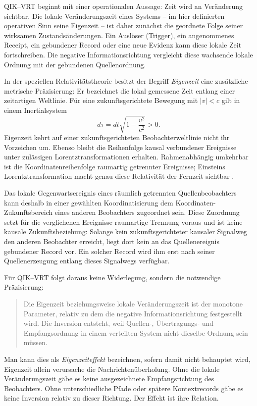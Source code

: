 \documentclass[11pt,a4paper]{article}
\theoremstyle{remark}
\newcommand{\qikvrt}{QIK--VRT}
\begin{document}
QIK--VRT beginnt mit einer operationalen Aussage: Zeit wird an Veränderung
sichtbar. Die lokale Veränderungszeit eines Systems -- im hier definierten
operativen Sinn seine Eigenzeit -- ist daher zunächst die geordnete Folge
seiner wirksamen Zustandsänderungen. Ein Auslöser (Trigger), ein angenommenes
Receipt, ein gebundener Record oder eine neue Evidenz kann diese lokale Zeit
fortschreiben. Die negative Informationsrichtung vergleicht diese wachsende
lokale Ordnung mit der gebundenen Quellenordnung.

In der speziellen Relativitätstheorie besitzt der Begriff \emph{Eigenzeit}
eine zusätzliche metrische Präzisierung: Er bezeichnet die lokal gemessene
Zeit entlang einer zeitartigen Weltlinie. Für eine zukunftsgerichtete Bewegung
mit \(|v|<c\) gilt in einem Inertialsystem
\[
  d\tau=dt\sqrt{1-\frac{v^2}{c^2}}>0.
\]
Eigenzeit kehrt auf einer zukunftsgerichteten Beobachterweltlinie nicht ihr
Vorzeichen um. Ebenso bleibt die Reihenfolge kausal verbundener Ereignisse
unter zulässigen Lorentztransformationen erhalten. Rahmenabhängig umkehrbar
ist die Koordinatenreihenfolge raumartig getrennter Ereignisse; Einsteins
Lorentztransformation macht genau diese Relativität der Fernzeit sichtbar
\cite{Einstein1905,Minkowski1909}.

Das lokale Gegenwartsereignis eines räumlich getrennten Quellenbeobachters
kann deshalb in einer gewählten Koordinatisierung dem
Koordinaten-Zukunftsbereich eines anderen Beobachters zugeordnet sein. Diese
Zuordnung setzt für die verglichenen Ereignisse raumartige Trennung voraus und
ist keine kausale Zukunftsbeziehung: Solange kein zukunftsgerichteter kausaler
Signalweg den anderen Beobachter erreicht, liegt dort kein an das
Quellenereignis gebundener Record vor. Ein solcher Record wird ihm erst nach
seiner Quellenerzeugung entlang dieses Signalwegs verfügbar.

Für \qikvrt{} folgt daraus keine Widerlegung, sondern die notwendige
Präzisierung:

\begin{quote}
Die Eigenzeit beziehungsweise lokale Veränderungszeit ist der monotone
Parameter, relativ zu dem die negative Informationsrichtung festgestellt wird.
Die Inversion entsteht, weil Quellen-, Übertragungs- und Empfangsordnung in
einem verteilten System nicht dieselbe Ordnung sein müssen.
\end{quote}

Man kann dies als \emph{Eigenzeiteffekt} bezeichnen, sofern damit nicht
behauptet wird, Eigenzeit allein verursache die Nachrichtenüberholung. Ohne
die lokale Veränderungszeit gäbe es keine ausgezeichnete Empfangsrichtung des
Beobachters. Ohne unterschiedliche Pfade oder spätere Kontextrecords gäbe es
keine Inversion relativ zu dieser Richtung. Der Effekt ist ihre Relation.
\end{document}

